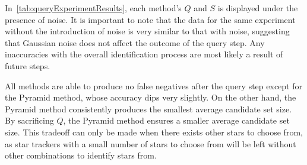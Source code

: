\begin{table}
\end{table}

In~\autoref{tab:queryExperimentResults}, each method's $Q$ and $S$ is displayed under the presence of noise.
It is important to note that the data for the same experiment without the introduction of noise is very similar to that
with noise, suggesting that Gaussian noise does not affect the outcome of the query step.
Any inaccuracies with the overall identification process are most likely a result of future steps.

All methods are able to produce no false negatives after the query step except for the Pyramid method, whose accuracy
dips very slightly.
On the other hand, the Pyramid method consistently produces the smallest average candidate set size.
By sacrificing $Q$, the Pyramid method ensures a smaller average candidate set size.
This tradeoff can only be made when there exists other stars to choose from, as star trackers with a small number of
stars to choose from will be left without other combinations to identify stars from.

